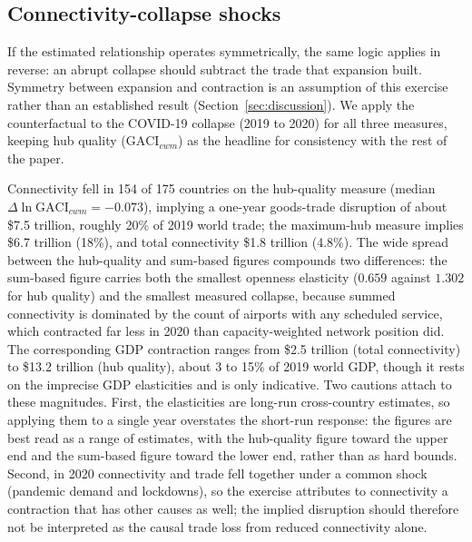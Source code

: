 \subsection{Connectivity-collapse shocks}
If the estimated relationship operates symmetrically, the same logic applies in reverse: an abrupt collapse should subtract the trade that expansion built. Symmetry between expansion and contraction is an assumption of this exercise rather than an established result (Section~\ref{sec:discussion}). We apply the counterfactual to the COVID-19 collapse (2019 to 2020) for all three measures, keeping hub quality ($\mathrm{GACI}_{cwm}$) as the headline for consistency with the rest of the paper. 

Connectivity fell in 154 of 175 countries on the hub-quality measure (median $\Delta\ln\mathrm{GACI}_{cwm}=-0.073$), implying a one-year goods-trade disruption of about \$7.5 trillion, roughly 20\% of 2019 world trade; the maximum-hub measure implies \$6.7 trillion (18\%), and total connectivity \$1.8 trillion (4.8\%). The wide spread between the hub-quality and sum-based figures compounds two differences: the sum-based figure carries both the smallest openness elasticity ($0.659$ against $1.302$ for hub quality) and the smallest measured collapse, because summed connectivity is dominated by the count of airports with any scheduled service, which contracted far less in 2020 than capacity-weighted network position did. The corresponding GDP contraction ranges from \$2.5 trillion (total connectivity) to \$13.2 trillion (hub quality), about 3 to 15\% of 2019 world GDP, though it rests on the imprecise GDP elasticities and is only indicative. Two cautions attach to these magnitudes. First, the elasticities are long-run cross-country estimates, so applying them to a single year overstates the short-run response: the figures are best read as a range of estimates, with the hub-quality figure toward the upper end and the sum-based figure toward the lower end, rather than as hard bounds. Second, in 2020 connectivity and trade fell together under a common shock (pandemic demand and lockdowns), so the exercise attributes to connectivity a contraction that has other causes as well; the implied disruption should therefore not be interpreted as the causal trade loss from reduced connectivity alone. 

